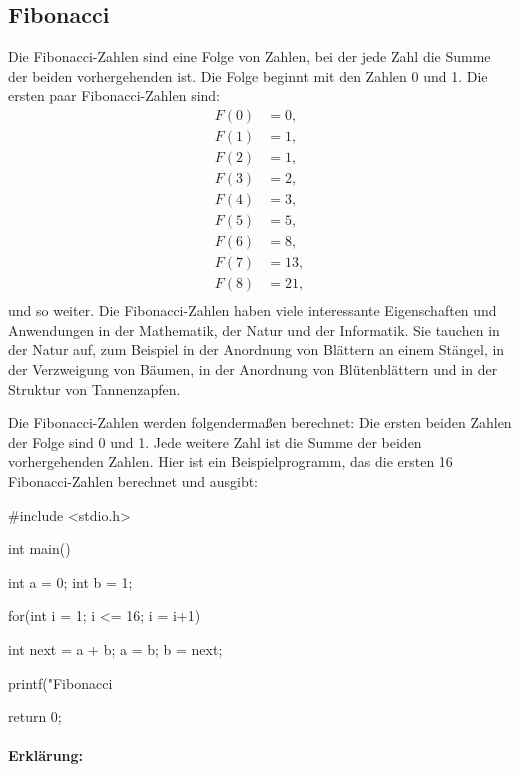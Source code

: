 \subsection{Fibonacci}
\label{sec:c:fibonacci}

Die Fibonacci-Zahlen \cite{wikipedia:fibonacci} sind eine Folge von Zahlen, bei der jede Zahl die Summe der beiden vorhergehenden ist. Die Folge beginnt mit den Zahlen 0 und 1. Die ersten paar Fibonacci-Zahlen sind:
\begin{align*}
  F(0) &= 0, \\
  F(1) &= 1, \\
  F(2) &= 1, \\
  F(3) &= 2, \\
  F(4) &= 3, \\
  F(5) &= 5, \\   
  F(6) &= 8, \\
  F(7) &= 13, \\
  F(8) &= 21, \\
\end{align*}
und so weiter. Die Fibonacci-Zahlen haben viele interessante Eigenschaften und Anwendungen in der Mathematik, der Natur und der Informatik. Sie tauchen in der Natur auf, zum Beispiel in der Anordnung von Blättern an einem Stängel, in der Verzweigung von Bäumen, in der Anordnung von Blütenblättern und in der Struktur von Tannenzapfen. 

Die Fibonacci-Zahlen werden folgendermaßen berechnet: Die ersten beiden Zahlen der Folge sind 0 und 1. Jede weitere Zahl ist die Summe der beiden vorhergehenden Zahlen. Hier ist ein Beispielprogramm, das die ersten 16 Fibonacci-Zahlen berechnet und ausgibt:

\begin{code}
#include <stdio.h>

int main() {
  int a = 0;
  int b = 1;

  for(int i = 1; i <= 16; i = i+1) {
    int next = a + b;
    a = b;
    b = next;

    printf("Fibonacci %
  }
  return 0;
}
\end{code}

\paragraph{Erklärung:}

